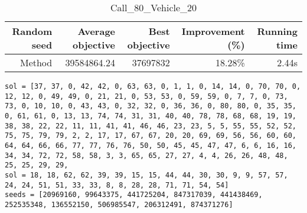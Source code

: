 \begin{table}[ht]
\centering
\caption{Call\_80\_Vehicle\_20}
\label{tab:call80vehicle20}
\begin{tabular}{|r|r|r|r|r|}
Random seed & Average objective & Best objective & Improvement (\%) & Running time \\
\hline
Method & 39584864.24 & 37697832 & 18.28\% & 2.44s\\
\end{tabular}
\end{table}
\begin{lstlisting}[label={lst:call80vehicle20},caption=Optimal solution call\_80\_vehicle\_20]
sol = [37, 37, 0, 42, 42, 0, 63, 63, 0, 1, 1, 0, 14, 14, 0, 70, 70, 0, 12, 12, 0, 49, 49, 0, 21, 21, 0, 53, 53, 0, 59, 59, 0, 7, 7, 0, 73, 73, 0, 10, 10, 0, 43, 43, 0, 32, 32, 0, 36, 36, 0, 80, 80, 0, 35, 35, 0, 61, 61, 0, 13, 13, 74, 74, 31, 31, 40, 40, 78, 78, 68, 68, 19, 19, 38, 38, 22, 22, 11, 11, 41, 41, 46, 46, 23, 23, 5, 5, 55, 55, 52, 52, 75, 75, 79, 79, 2, 2, 17, 17, 67, 67, 20, 20, 69, 69, 56, 56, 60, 60, 64, 64, 66, 66, 77, 77, 76, 76, 50, 50, 45, 45, 47, 47, 6, 6, 16, 16, 34, 34, 72, 72, 58, 58, 3, 3, 65, 65, 27, 27, 4, 4, 26, 26, 48, 48, 25, 25, 29, 29,
sol = 18, 18, 62, 62, 39, 39, 15, 15, 44, 44, 30, 30, 9, 9, 57, 57, 24, 24, 51, 51, 33, 33, 8, 8, 28, 28, 71, 71, 54, 54]
seeds = [20969160, 99643375, 441725204, 847317039, 441438469, 252535348, 136552150, 506985547, 206312491, 874371276]
\end{lstlisting}
\clearpage


